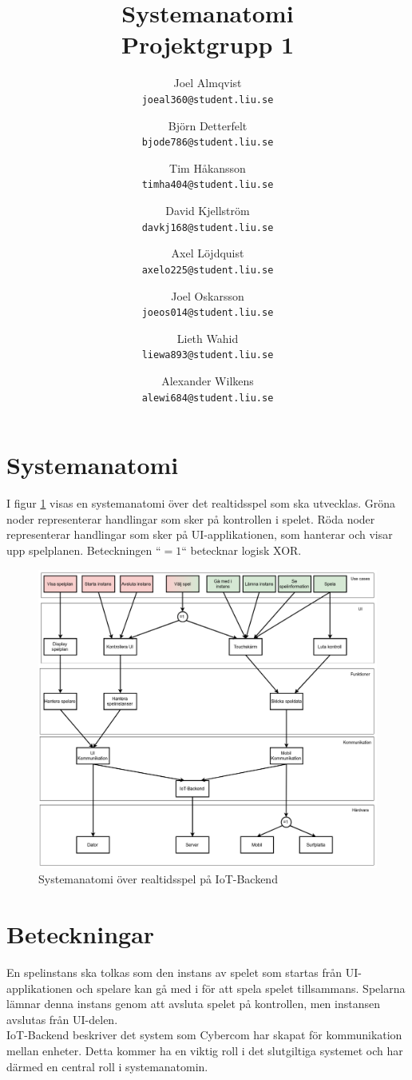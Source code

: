 \documentclass[10pt]{article}
\title{Systemanatomi\\
    \large Projektgrupp 1}
\author{
    Joel Almqvist\\
    \texttt{joeal360@student.liu.se}
    \and
    Björn Detterfelt\\
    \texttt{bjode786@student.liu.se}
    \and
    Tim Håkansson\\
    \texttt{timha404@student.liu.se}
    \and
    David Kjellström\\
    \texttt{davkj168@student.liu.se}
    \and
    Axel Löjdquist\\
    \texttt{axelo225@student.liu.se}
    \and
    Joel Oskarsson\\
    \texttt{joeos014@student.liu.se}
    \and
    Lieth Wahid\\
    \texttt{liewa893@student.liu.se}
    \and
    Alexander Wilkens\\
    \texttt{alewi684@student.liu.se}
}
\begin{document}
	\maketitle
	
	\tableofcontents

	\pagebreak
	
	\section{Systemanatomi}	
		I figur \ref{fig:graf} visas en systemanatomi över det realtidsspel som ska utvecklas. Gröna noder representerar handlingar som sker på kontrollen i spelet. Röda noder representerar handlingar som sker på UI-applikationen, som hanterar och visar upp spelplanen. Beteckningen ``$= 1$`` betecknar logisk XOR. 
	
		\begin{figure}[h]
			\centering
			\includegraphics[scale=0.4]{systemanatomi_graf}
			\caption{Systemanatomi över realtidsspel på IoT-Backend}
			\label{fig:graf}
		\end{figure}	
	
	\section{Beteckningar}
	En spelinstans ska tolkas som den instans av spelet som startas från UI-applikationen och spelare kan gå med i för att spela spelet tillsammans. Spelarna lämnar denna instans genom att avsluta spelet på kontrollen, men instansen avslutas från UI-delen.\\
	
	IoT-Backend beskriver det system som Cybercom har skapat för kommunikation mellan enheter. Detta kommer ha en viktig roll i det slutgiltiga systemet och har därmed en central roll i systemanatomin.\\
	
\end{document}
